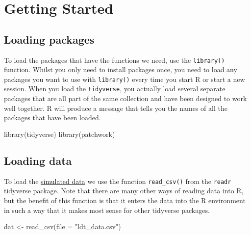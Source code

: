 \documentclass[
  english,
  doc,floatsintext]{apa6}
\newenvironment{Shaded}{\begin{snugshade}}{\end{snugshade}}
\newcommand{\AttributeTok}[1]{\textcolor[rgb]{0.77,0.63,0.00}{#1}}
\newcommand{\FunctionTok}[1]{\textcolor[rgb]{0.00,0.00,0.00}{#1}}
\newcommand{\NormalTok}[1]{#1}
\newcommand{\OtherTok}[1]{\textcolor[rgb]{0.56,0.35,0.01}{#1}}
\newcommand{\StringTok}[1]{\textcolor[rgb]{0.31,0.60,0.02}{#1}}
\begin{document}
\hypertarget{getting-started}{%
\section{Getting Started}\label{getting-started}}

\hypertarget{loading-packages}{%
\subsection{Loading packages}\label{loading-packages}}

To load the packages that have the functions we need, use the \texttt{library()} function. Whilst you only need to install packages once, you need to load any packages you want to use with \texttt{library()} every time you start R or start a new session. When you load the \texttt{tidyverse}, you actually load several separate packages that are all part of the same collection and have been designed to work well together. R will produce a message that tells you the names of all the packages that have been loaded.

\begin{Shaded}
\begin{Highlighting}[]
\FunctionTok{library}\NormalTok{(tidyverse)}
\FunctionTok{library}\NormalTok{(patchwork)}
\end{Highlighting}
\end{Shaded}

\hypertarget{loading-data}{%
\subsection{Loading data}\label{loading-data}}

To load the \href{https://osf.io/bj83f/files/}{simulated data} we use the function \texttt{read\_csv()} from the \texttt{readr} tidyverse package. Note that there are many other ways of reading data into R, but the benefit of this function is that it enters the data into the R environment in such a way that it makes most sense for other tidyverse packages.

\begin{Shaded}
\begin{Highlighting}[]
\NormalTok{dat }\OtherTok{\textless{}{-}} \FunctionTok{read\_csv}\NormalTok{(}\AttributeTok{file =} \StringTok{"ldt\_data.csv"}\NormalTok{)}
\end{Highlighting}
\end{Shaded}
\end{document}
